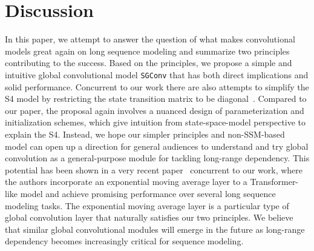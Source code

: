 \section{Discussion}
In this paper, we attempt to answer the question of what makes convolutional models great again on long sequence modeling and summarize two principles contributing to the success. Based on the principles, we propose a simple and intuitive global convolutional model \texttt{SGConv} that has both direct implications and solid performance. Concurrent to our work there are also attempts to simplify the S4 model by restricting the state transition matrix to be diagonal~\citep{gu2022parameterization}. Compared to our paper, the proposal \citet{gu2022parameterization} again involves a nuanced design of parameterization and initialization schemes, which give intuition from state-space-model perspective to explain the S4. Instead, we hope our simpler principles and non-SSM-based model can open up a direction for general audiences to understand and try global convolution as a general-purpose module for tackling long-range dependency. This potential has been shown in a very recent paper~\citep{ma2022mega} concurrent to our work, where the authors incorporate an exponential moving average layer to a Transformer-like model and achieve promising performance over several long sequence modeling tasks. The exponential moving average layer is a particular type of global convolution layer that naturally satisfies our two principles. We believe that similar global convolutional modules will emerge in the future as long-range dependency becomes increasingly critical for sequence modeling.



